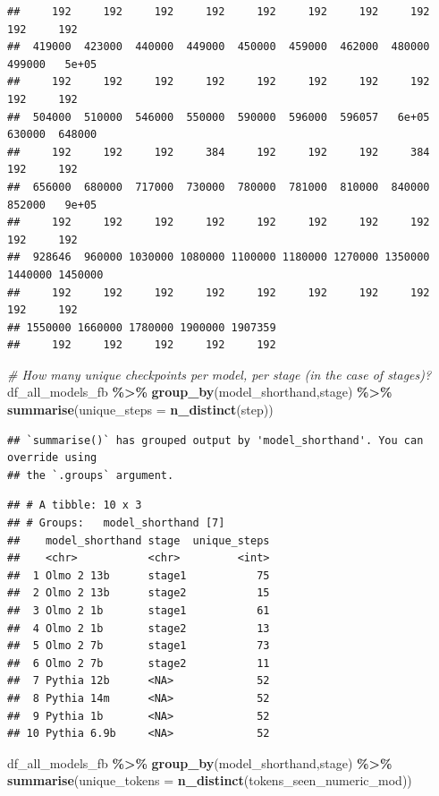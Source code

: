 \documentclass[
]{article}
\newenvironment{Shaded}{\begin{snugshade}}{\end{snugshade}}
\newcommand{\AttributeTok}[1]{\textcolor[rgb]{0.13,0.29,0.53}{#1}}
\newcommand{\CommentTok}[1]{\textcolor[rgb]{0.56,0.35,0.01}{\textit{#1}}}
\newcommand{\FunctionTok}[1]{\textcolor[rgb]{0.13,0.29,0.53}{\textbf{#1}}}
\newcommand{\NormalTok}[1]{#1}
\newcommand{\SpecialCharTok}[1]{\textcolor[rgb]{0.81,0.36,0.00}{\textbf{#1}}}
\begin{document}
\begin{verbatim}
##     192     192     192     192     192     192     192     192     192     192 
##  419000  423000  440000  449000  450000  459000  462000  480000  499000   5e+05 
##     192     192     192     192     192     192     192     192     192     192 
##  504000  510000  546000  550000  590000  596000  596057   6e+05  630000  648000 
##     192     192     192     384     192     192     192     384     192     192 
##  656000  680000  717000  730000  780000  781000  810000  840000  852000   9e+05 
##     192     192     192     192     192     192     192     192     192     192 
##  928646  960000 1030000 1080000 1100000 1180000 1270000 1350000 1440000 1450000 
##     192     192     192     192     192     192     192     192     192     192 
## 1550000 1660000 1780000 1900000 1907359 
##     192     192     192     192     192
\end{verbatim}

\begin{Shaded}
\begin{Highlighting}[]
\CommentTok{\# How many unique checkpoints per model, per stage (in the case of stages)?}
\NormalTok{df\_all\_models\_fb }\SpecialCharTok{\%\textgreater{}\%} 
  \FunctionTok{group\_by}\NormalTok{(model\_shorthand,stage) }\SpecialCharTok{\%\textgreater{}\%} 
  \FunctionTok{summarise}\NormalTok{(}\AttributeTok{unique\_steps =} \FunctionTok{n\_distinct}\NormalTok{(step))}
\end{Highlighting}
\end{Shaded}

\begin{verbatim}
## `summarise()` has grouped output by 'model_shorthand'. You can override using
## the `.groups` argument.
\end{verbatim}

\begin{verbatim}
## # A tibble: 10 x 3
## # Groups:   model_shorthand [7]
##    model_shorthand stage  unique_steps
##    <chr>           <chr>         <int>
##  1 Olmo 2 13b      stage1           75
##  2 Olmo 2 13b      stage2           15
##  3 Olmo 2 1b       stage1           61
##  4 Olmo 2 1b       stage2           13
##  5 Olmo 2 7b       stage1           73
##  6 Olmo 2 7b       stage2           11
##  7 Pythia 12b      <NA>             52
##  8 Pythia 14m      <NA>             52
##  9 Pythia 1b       <NA>             52
## 10 Pythia 6.9b     <NA>             52
\end{verbatim}

\begin{Shaded}
\begin{Highlighting}[]
\NormalTok{df\_all\_models\_fb }\SpecialCharTok{\%\textgreater{}\%} 
  \FunctionTok{group\_by}\NormalTok{(model\_shorthand,stage) }\SpecialCharTok{\%\textgreater{}\%} 
  \FunctionTok{summarise}\NormalTok{(}\AttributeTok{unique\_tokens =} \FunctionTok{n\_distinct}\NormalTok{(tokens\_seen\_numeric\_mod))}
\end{Highlighting}
\end{Shaded}
\end{document}
